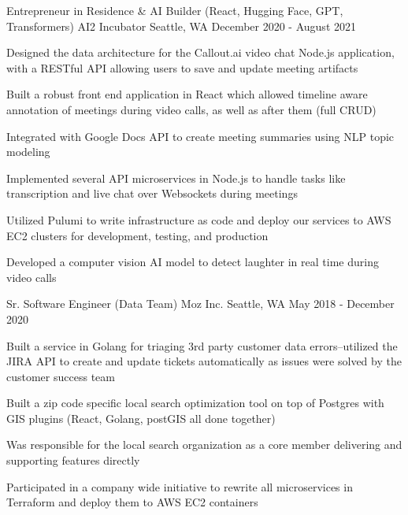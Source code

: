 \begin{cventries}
  \cventry
    {Entrepreneur in Residence \& AI Builder (React, Hugging Face, GPT, Transformers)} %
    {AI2 Incubator} %
    {Seattle, WA} %
    {December 2020 - August 2021} %
    {
      \begin{cvitems} %
        \item {Designed the data architecture for the Callout.ai video chat Node.js application, with a RESTful API allowing users to save and update meeting artifacts}
        \item {Built a robust front end application in React which allowed timeline aware annotation of meetings during video calls, as well as after them (full CRUD)}
        \item {Integrated with Google Docs API to create meeting summaries using NLP topic modeling}
        \item {Implemented several API microservices in Node.js to handle tasks like transcription and live chat over Websockets during meetings}
        \item {Utilized Pulumi to write infrastructure as code and deploy our services to AWS EC2 clusters for development, testing, and production}
        \item {Developed a computer vision AI model to detect laughter in real time during video calls}
      \end{cvitems}
    }

  \cventry
    {Sr. Software Engineer (Data Team)} %
    {Moz Inc.} %
    {Seattle, WA} %
    {May 2018 - December 2020} %
    {
      \begin{cvitems} %
        \item {Built a service in Golang for triaging 3rd party customer data errors--utilized the JIRA API to create and update tickets automatically as issues were solved by the customer success team}
        \item {Built a zip code specific local search optimization tool on top of Postgres with GIS plugins (React, Golang, postGIS all done together)}
        \item {Was responsible for the local search organization as a core member delivering and supporting features directly}
        \item {Participated in a company wide initiative to rewrite all microservices in Terraform and deploy them to AWS EC2 containers}
      \end{cvitems}
    }


\end{cventries}
